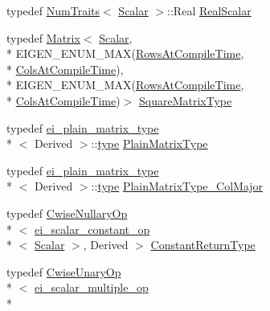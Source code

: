 \begin{DoxyCompactItemize}
typedef \hyperlink{struct_num_traits}{Num\-Traits}$<$ \hyperlink{class_matrix_base_a625df8339dc2d816cbc0fd66e7dadaf5}{Scalar} $>$\-::Real \hyperlink{class_matrix_base_a634804c67de40fec74e3640bc229364c}{Real\-Scalar}
\item 
typedef \hyperlink{class_matrix}{Matrix}$<$ \hyperlink{class_matrix_base_a625df8339dc2d816cbc0fd66e7dadaf5}{Scalar}, \\*
E\-I\-G\-E\-N\-\_\-\-E\-N\-U\-M\-\_\-\-M\-A\-X(\hyperlink{class_matrix_base_aaa53a8ec1bc1ba52b1e50631dac15d6da10c48c1361376cbd5ef62a18966f2691}{Rows\-At\-Compile\-Time}, \\*
\hyperlink{class_matrix_base_aaa53a8ec1bc1ba52b1e50631dac15d6da359babfd1277ae780433d99b383e00e8}{Cols\-At\-Compile\-Time}), \\*
E\-I\-G\-E\-N\-\_\-\-E\-N\-U\-M\-\_\-\-M\-A\-X(\hyperlink{class_matrix_base_aaa53a8ec1bc1ba52b1e50631dac15d6da10c48c1361376cbd5ef62a18966f2691}{Rows\-At\-Compile\-Time}, \\*
\hyperlink{class_matrix_base_aaa53a8ec1bc1ba52b1e50631dac15d6da359babfd1277ae780433d99b383e00e8}{Cols\-At\-Compile\-Time})$>$ \hyperlink{class_matrix_base_a7f198324e9378d401b50e6aa5fc289ae}{Square\-Matrix\-Type}
\item 
typedef \hyperlink{structei__plain__matrix__type}{ei\-\_\-plain\-\_\-matrix\-\_\-type}\\*
$<$ Derived $>$\-::\hyperlink{glext_8h_a7d05960f4f1c1b11f3177dc963a45d86}{type} \hyperlink{class_matrix_base_aa6a23b3d1aac2a1b4b9d8bcb54e1e2bc}{Plain\-Matrix\-Type}
\item 
typedef \hyperlink{structei__plain__matrix__type}{ei\-\_\-plain\-\_\-matrix\-\_\-type}\\*
$<$ Derived $>$\-::\hyperlink{glext_8h_a7d05960f4f1c1b11f3177dc963a45d86}{type} \hyperlink{class_matrix_base_ac3f83c75b9153e7b49ea42f15325aa34}{Plain\-Matrix\-Type\-\_\-\-Col\-Major}
\item 
typedef \hyperlink{class_cwise_nullary_op}{Cwise\-Nullary\-Op}\\*
$<$ \hyperlink{structei__scalar__constant__op}{ei\-\_\-scalar\-\_\-constant\-\_\-op}\\*
$<$ \hyperlink{class_matrix_base_a625df8339dc2d816cbc0fd66e7dadaf5}{Scalar} $>$, Derived $>$ \hyperlink{class_matrix_base_aa9bcfa09043d1337c3575f008d3e04da}{Constant\-Return\-Type}
\item 
typedef \hyperlink{class_cwise_unary_op}{Cwise\-Unary\-Op}\\*
$<$ \hyperlink{structei__scalar__multiple__op}{ei\-\_\-scalar\-\_\-multiple\-\_\-op}\\*

\end{DoxyCompactItemize}
